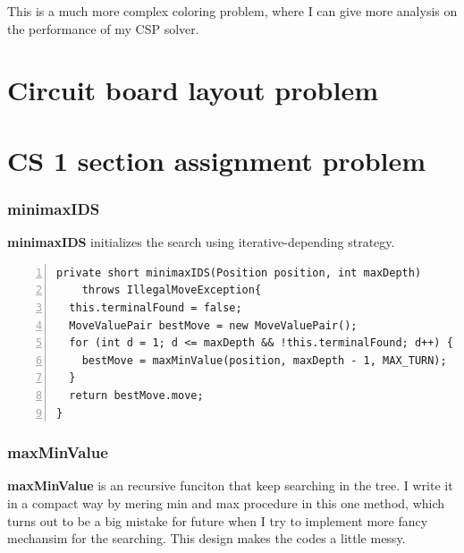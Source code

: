 \documentclass{article}
\begin{document}
This is a much more complex coloring problem, where I can give more analysis on the performance of my CSP solver. 

\section{Circuit board layout problem}
\section{CS 1 section assignment problem}

































\subsubsection{minimaxIDS}

\textbf{minimaxIDS} initializes the search using iterative-depending strategy.


\begin{lstlisting}[numbers=left]
private short minimaxIDS(Position position, int maxDepth) 
    throws IllegalMoveException{
  this.terminalFound = false;
  MoveValuePair bestMove = new MoveValuePair();
  for (int d = 1; d <= maxDepth && !this.terminalFound; d++) {
    bestMove = maxMinValue(position, maxDepth - 1, MAX_TURN);
  }
  return bestMove.move;
}
\end{lstlisting}


\subsubsection{maxMinValue}

\textbf{maxMinValue} is an recursive funciton that keep searching in the tree. I write it in a compact way by mering min and max procedure in this one method, which turns out to be a big mistake for future when I try to implement more fancy mechansim for the searching. This design makes the codes a little messy.
\end{document}
